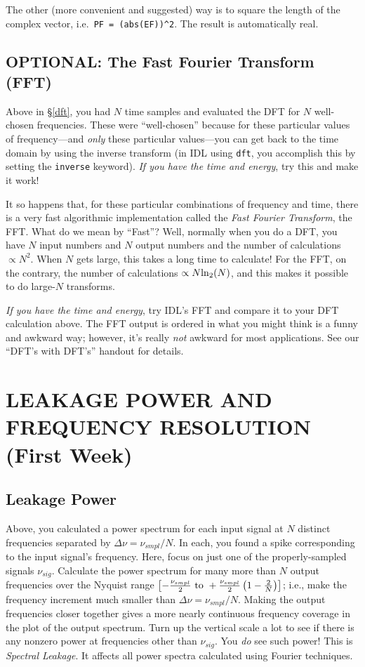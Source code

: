\documentclass[11pt,preprint]{aastex}
\begin{document}
The other (more convenient and suggested) way is to square the length of
the complex vector, i.e.\ \verb$PF = (abs(EF))^2$. The result is
automatically real.

\subsection{OPTIONAL: The Fast Fourier Transform (FFT)} \label{fft}

Above in \S \ref{dft}, you had $N$ time samples and evaluated the DFT
for $N$ well-chosen frequencies. These were ``well-chosen'' because for
these particular values of frequency---and {\it only} these particular
values---you can get back to the time domain by using the inverse
transform (in IDL using {\tt dft}, you accomplish this by setting the
{\tt inverse} keyword). {\it If you have the time and energy}, try this
and make it work!

It so happens that, for these particular combinations of frequency and
time, there is a very fast algorithmic implementation called the {\it
  Fast Fourier Transform}, the FFT. What do we mean by ``Fast''? Well,
normally when you do a DFT, you have $N$ input numbers and $N$ output
numbers and the number of calculations $\propto N^2$. When $N$ gets large,
this takes a long time to calculate! For the FFT, on the contrary, the
number of calculations $\propto N {\rm ln}_2(N)$, and this makes it
possible to do large-$N$ transforms. 

{\it If you have the time and energy}, try IDL's FFT and compare it to
your DFT calculation above. The FFT output is ordered in what you might
think is a funny and awkward way; however, it's really {\it not} awkward
for most applications. See our ``DFT's with DFT's'' handout for details.

\section{ LEAKAGE POWER AND FREQUENCY RESOLUTION (First Week)} \label{leakage}

\subsection{Leakage Power}

Above, you calculated a power spectrum for each input signal at $N$
distinct frequencies separated by $\Delta \nu = \nu_{smpl}/N$. In each,
you found a spike corresponding to the input signal's frequency. Here,
focus on just one of the properly-sampled signals $\nu_{sig}$. Calculate
the power spectrum for many more than $N$ output frequencies over the
Nyquist range $\left[-{\nu_{smpl} \over 2} \ {\rm to}\ +{\nu_{smpl}
\over 2} \left( 1 - {2 \over N} \right)\right]$; i.e., make the
frequency increment much smaller than $\Delta \nu = \nu_{smpl}/N$.
Making the output frequencies closer together gives a more nearly
continuous frequency coverage in the plot of the output spectrum.  Turn
up the vertical scale a lot to see if there is any nonzero power at
frequencies other than $\nu_{sig}$.  You {\it do} see such power! This
is {\it Spectral Leakage}. It affects all power spectra calculated using
Fourier techniques. 
\end{document}
